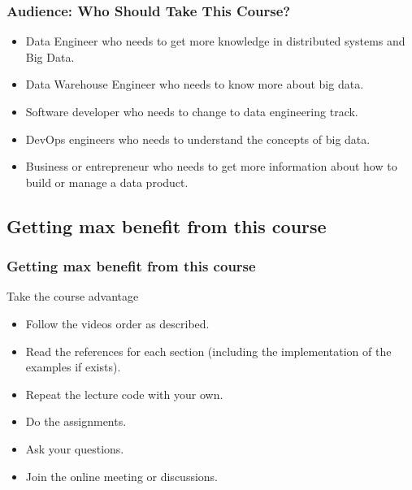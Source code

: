 \begin{frame}
\frametitle{Audience: Who Should Take This Course?}

\begin{itemize}[<+->]
	\item Data Engineer who needs to get more knowledge in distributed systems and Big Data.
	\item Data Warehouse Engineer who needs to know more about big data.
	\item Software developer who needs to change to data engineering track. 
	\item DevOps engineers who needs to understand the concepts of big data.  
	\item Business or entrepreneur who needs to get more information about how to build or manage a data product.
\end{itemize}

\end{frame}


\subsection{Getting max benefit from this course}

\begin{frame}
\frametitle{Getting max benefit from this course}
\begin{block}{Take the course advantage}
	\begin{itemize}[<+->]
		\item Follow the videos order as described.
		\item Read the references for each section (including the implementation of the examples if exists). 
		\item Repeat the lecture code with your own.  
		\item Do the assignments.
		\item Ask your questions. 
		\item Join the online meeting or discussions. 
	\end{itemize}
\end{block}

\end{frame}


